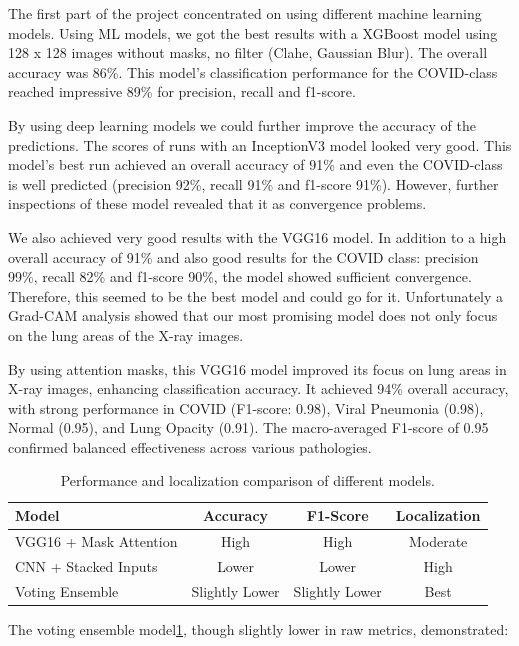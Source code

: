\documentclass{article}
\begin{document}
The first part of the project concentrated on using different machine learning models. Using ML models, we got the best results with a XGBoost model using 128 x 128 images without masks, no filter (Clahe, Gaussian Blur). The overall accuracy was 86\%. This model's classification performance for the COVID-class reached impressive 89\% for precision, recall and f1-score. 

By using deep learning models we could further improve the accuracy of the predictions. The scores of runs with an InceptionV3 model looked very good. This model's best run achieved an overall accuracy of 91\% and even the COVID-class is well predicted (precision 92\%, recall 91\% and f1-score 91\%). However, further inspections of these model revealed that it as convergence problems. 

We also achieved very good results with the VGG16 model. In addition to a high overall accuracy of 91\% and also good results for the COVID class: precision 99\%, recall 82\% and f1-score 90\%, the model showed sufficient convergence. Therefore, this seemed to be the best model and could go for it. Unfortunately a Grad-CAM analysis showed that our most promising model does not only focus on the lung areas of the X-ray images. 

By using attention masks, this VGG16 model improved its focus on lung areas in X-ray images, enhancing classification accuracy. It achieved 94\% overall accuracy, with strong performance in COVID (F1-score: 0.98), Viral Pneumonia (0.98), Normal (0.95), and Lung Opacity (0.91). The macro-averaged F1-score of 0.95 confirmed balanced effectiveness across various pathologies.


\begin{table}[hb]
\centering
\begin{tabular}{|l|c|c|c|}
\hline
\textbf{Model} & \textbf{Accuracy} & \textbf{F1-Score} & \textbf{Localization} \\
\hline
VGG16 + Mask Attention & High & High & Moderate \\
\hline
CNN + Stacked Inputs & Lower & Lower & High \\
\hline
Voting Ensemble & Slightly Lower & Slightly Lower & Best \\
\hline
\end{tabular}
\caption{Performance and localization comparison of different models.}
\label{tab:ensemble_performance}
\end{table}

The voting ensemble model\ref{tab:ensemble_performance}, though slightly lower in raw metrics, demonstrated:
\end{document}
